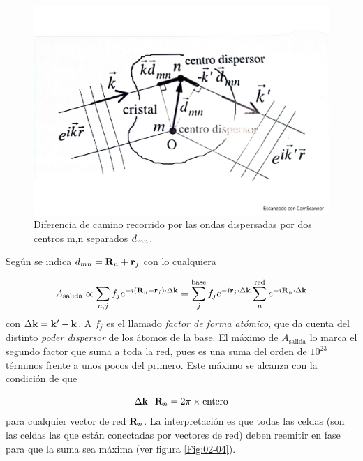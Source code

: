 \begin{figure}[h!] \centering
    \includegraphics[scale=0.35]{Cuerpo/Ch_02/Fotos_libro 2.pdf}
    \caption{Diferencia de camino recorrido por las ondas dispersadas por dos centros m,n separados $\mathbf{}d_{mn}$.}
    \label{Fig:02-02}
\end{figure}

Según se indica $\mathbf{}d_{mn}=\mathbf{R}_n+\mathbf{r}_j$ con lo cualquiera

\begin{equation}
    A_{\text{salida}} \propto  \sum_{n,j} f_j e^{-i (\mathbf{R}_n + \mathbf{r}_j) \cdot \Delta \mathbf{k}} = \sum_j^{\text{base}} f_j e^{-i \mathbf{r}_j \cdot \Delta \mathbf{k}} \sum_{n}^{\text{red}} e^{-i\mathbf{R}_n \cdot \Delta \mathbf{k}} \label{Ec:02-02-02}
\end{equation}
con $\Delta \mathbf{k} = \mathbf{k}' - \mathbf{k}$. A $f_j$ es el llamado \textit{factor de forma atómico}, que da cuenta del distinto \textit{poder dispersor} de los átomos de la base. El máximo de $A_{\text{salida}}$ lo marca el segundo factor que suma a toda la red, pues es una suma del orden de $10^{23}$ términos frente a unos pocos del primero. Este máximo se alcanza con la condición de que

\begin{equation}
    \Delta \mathbf{k} \cdot \mathbf{R}_n = 2 \pi \times \text{entero} \label{Ec:02-02-03}
\end{equation}
para cualquier vector de red $\mathbf{R}_n$. La interpretación es que todas las celdas (son las celdas las que están conectadas por vectores de red) deben reemitir en fase para que la suma sea máxima (ver figura \ref{Fig:02-04}).
    
